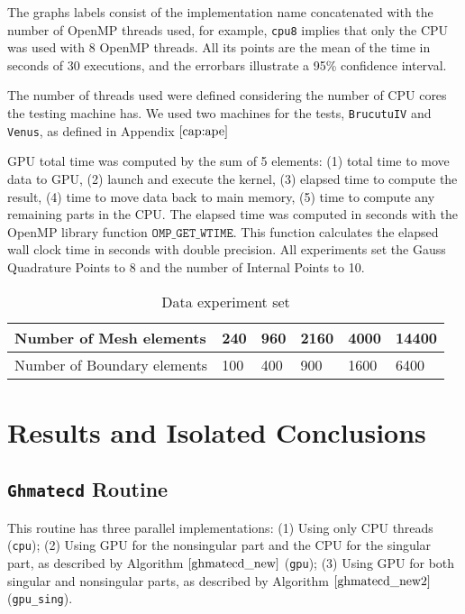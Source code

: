 The graphs labels consist of the implementation name concatenated with the number of OpenMP threads used, 
for example, \texttt{cpu8} implies that only the CPU was used with 8 OpenMP threads. All its points 
are the mean of the time in seconds of 30 executions, and the errorbars illustrate a 95\% confidence interval.

The number of threads used were defined considering the number of CPU cores the testing machine has. 
We used two machines for the tests, \texttt{BrucutuIV} and \texttt{Venus}, as defined in Appendix $\ref{cap:ape}$

GPU total time was computed by the sum of 5 elements: 
(1) total time to move data to GPU, (2) launch and execute the kernel, (3) elapsed time 
to compute the result, (4) time to move data back to main memory, (5) time to compute 
any remaining parts in the CPU. 
The elapsed time was computed in seconds with the OpenMP library function 
$\texttt{OMP\_GET\_WTIME}$. This function calculates the elapsed wall clock time in seconds 
with double precision. All experiments set the Gauss Quadrature Points to 8 and
the number of Internal Points to 10.

\begin{table}[]
\centering
\caption{Data experiment set}
\label{experiments}
\begin{tabular}{|l|l|l|l|l|l|}
\hline
Number of Mesh elements     & 240 & 960 & 2160 & 4000 & 14400\\ \hline
Number of Boundary elements & 100 & 400 & 900  & 1600 & 6400\\ \hline
\end{tabular}
\end{table}

\section{Results and Isolated Conclusions}

\subsection{\texttt{Ghmatecd} Routine}

This routine has three parallel implementations: (1) Using only CPU threads 
(\texttt{cpu}); (2) Using GPU for the nonsingular part and the CPU for the 
singular part, as described by Algorithm $\ref{ghmatecd_new}$ (\texttt{gpu}); 
(3) Using GPU for both singular and nonsingular parts, as described by Algorithm 
$\ref{ghmatecd_new2}$ (\texttt{gpu\_sing}).                                    

